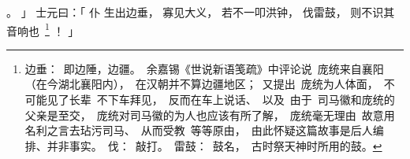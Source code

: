     。
」
士元曰：「
    仆
    生出边垂，
    寡见大义，
    若不一叩洪钟，
    伐雷鼓，
    则不识其音响\mbox{也%
    \footnote{%
        边垂：
            即边陲，边疆。
            余嘉锡《世说新语笺疏》中评论说
            庞统来自襄阳（在今湖北襄阳内），
            在汉朝并不算边疆地区；
            又提出
            庞统为人体面，
            不可能见了长辈
            不下车拜见，
            反而在车上说话、
            以及
            由于
            司马徽和庞统的父亲是至交，
            庞统对司马徽的为人也应该有所了解，
            庞统毫无理由
            故意用名利之言去玷污司马、
            从而受教
            等等原由，
            由此怀疑这篇故事是后人编排、并非事实。
        伐：
            敲打。
        雷鼓：
            鼓名，
            古时祭天神时所用的鼓。
    }}%
    ！
」

\switchcolumn


 
